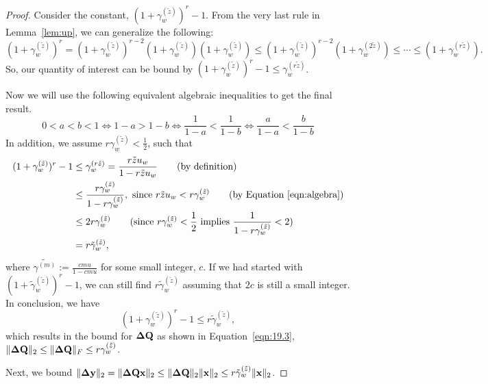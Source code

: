 \begin{proof}
	Consider the constant, $(1+\gamma_w^{(\tilde{z})})^r-1$.
	From the very last rule in Lemma~\ref{lem:up}, we can generalize the following:
	\begin{equation*}
	(1+\gamma_w^{(\tilde{z})})^r = (1+\gamma_w^{(\tilde{z})})^{r-2}(1+\gamma_w^{(\tilde{z})})(1+\gamma_w^{(\tilde{z})}) \leq  (1+\gamma_w^{(\tilde{z})})^{r-2}(1+\gamma_w^{(2\tilde{z})}) \leq \cdots \leq (1+\gamma_w^{(r\tilde{z})}).
	\end{equation*}
	So, our quantity of interest can be bound by $(1+\gamma_w^{(\tilde{z})})^r-1 \leq \gamma_w^{(r\tilde{z})}$.
	
	Now we will use the following equivalent algebraic inequalities to get the final result.
	\begin{equation}
	0<a<b<1 \Leftrightarrow 1-a > 1-b \Leftrightarrow \frac{1}{1-a} <\frac{1}{1-b} \Leftrightarrow \frac{a}{1-a} < \frac{b}{1-b}
	\label{eqn:algebra}
	\end{equation}
	In addition, we assume $r\gamma_w^{(\tilde{z})}< \frac{1}{2}$, such that 
	\begin{align*}
	(1+\gamma_w^{(\tilde{z})})^r-1 &\leq \gamma_w^{(r\tilde{z})} = \frac{r\tilde{z}u_w}{1-r\tilde{z}u_w}\qquad\text{(by definition)}\\
	&\leq \frac{r\gamma_w^{(\tilde{z})}}{1-r\gamma_w^{(\tilde{z})}},\text{ since } r\tilde{z}u_w < r\gamma_w^{(\tilde{z})}\qquad\text{(by Equation \ref{eqn:algebra})}\\
	&\leq 2 r \gamma_w^{(\tilde{z})}\qquad\text{(since $r\gamma_w^{(\tilde{z})}< \frac{1}{2}$ implies  $\frac{1}{1-r\gamma_w^{(\tilde{z})}} < 2$)}\\
	&= r\tilde{\gamma}_w^{(\tilde{z})},
	\end{align*}
	where $\tilde{\gamma^{(m)}}:= \frac{cmu}{1-cmu}$ for some small integer, $c$.
	If we had started with $(1+\tilde{\gamma}_w^{(\tilde{z})})^r-1$, we can still find $r\tilde{\gamma}_w^{(\tilde{z})}$ assuming that $2c$ is still a small integer. 
	In conclusion, we have 
	$$
	(1+\gamma_w^{(\tilde{z})})^r-1 \leq r\tilde{\gamma}_w^{(\tilde{z})},
	$$
	which results in the bound for $\mathbf{\Delta Q}$ as shown in Equation~\ref{eqn:19.3}, $\|\mathbf{\Delta Q}\|_2 \leq \|\mathbf{\Delta Q}\|_F \leq r\gamma_w^{(\tilde{z})}$.

	Next, we bound $\|\mathbf{\Delta y}\|_2 = \|\mathbf{\Delta Q x}\|_2 \leq \|\mathbf{\Delta Q}\|_2 \|\mathbf{x}\|_2 \leq  r\tilde{\gamma}_w^{(\tilde{z})}\|\mathbf{x}\|_2$.
	

\end{proof}
